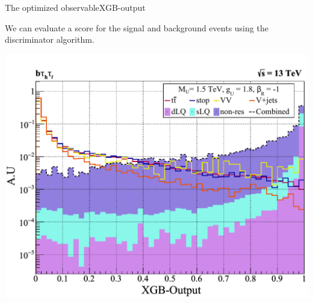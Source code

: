 \documentclass{bredelebeamer}
\begin{document}
\begin{frame}{The optimized observable}{XGB-output}

	We can evaluate a score for the signal and background events using the discriminator algorithm. 

	\begin{center}
		\includegraphics[width=.75\linewidth]{ML_semileptonic_sLQ_wRHC.pdf}
	\end{center}
		
\end{frame}
\end{document}
